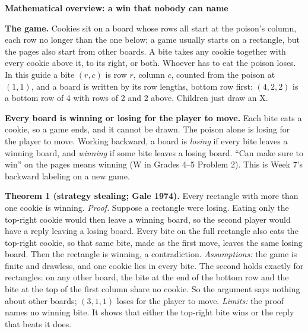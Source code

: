 \documentclass[11pt]{article}
\newcommand{\head}[1]{\par\textbf{\large #1}\par}
\newcommand{\pos}[1]{$(#1)$}
\begin{document}
\head{Mathematical overview: a win that nobody can name}
\textbf{The game.} Cookies sit on a board whose rows all start at the poison's column, each row no longer than the one below; a game usually starts on a rectangle, but the pages also start from other boards. A bite takes any cookie together with every cookie above it, to its right, or both. Whoever has to eat the poison loses. In this guide a bite $(r,c)$ is row $r$, column $c$, counted from the poison at $(1,1)$, and a board is written by its row lengths, bottom row first: \pos{4,2,2} is a bottom row of 4 with rows of 2 and 2 above. Children just draw an X.

\textbf{Every board is winning or losing for the player to move.} Each bite eats a cookie, so a game ends, and it cannot be drawn. The poison alone is losing for the player to move. Working backward, a board is \emph{losing} if every bite leaves a winning board, and \emph{winning} if some bite leaves a losing board. ``Can make sure to win'' on the pages means winning (W in Grades 4--5 Problem 2). This is Week 7's backward labeling on a new game.

\textbf{Theorem 1 (strategy stealing; Gale 1974).} Every rectangle with more than one cookie is winning. \emph{Proof.} Suppose a rectangle were losing. Eating only the top-right cookie would then leave a winning board, so the second player would have a reply leaving a losing board. Every bite on the full rectangle also eats the top-right cookie, so that same bite, made as the first move, leaves the same losing board. Then the rectangle is winning, a contradiction. \emph{Assumptions:} the game is finite and drawless, and one cookie lies in every bite. The second holds exactly for rectangles: on any other board, the bite at the end of the bottom row and the bite at the top of the first column share no cookie. So the argument says nothing about other boards; \pos{3,1,1} loses for the player to move. \emph{Limits:} the proof names no winning bite. It shows that either the top-right bite wins or the reply that beats it does.
\end{document}
